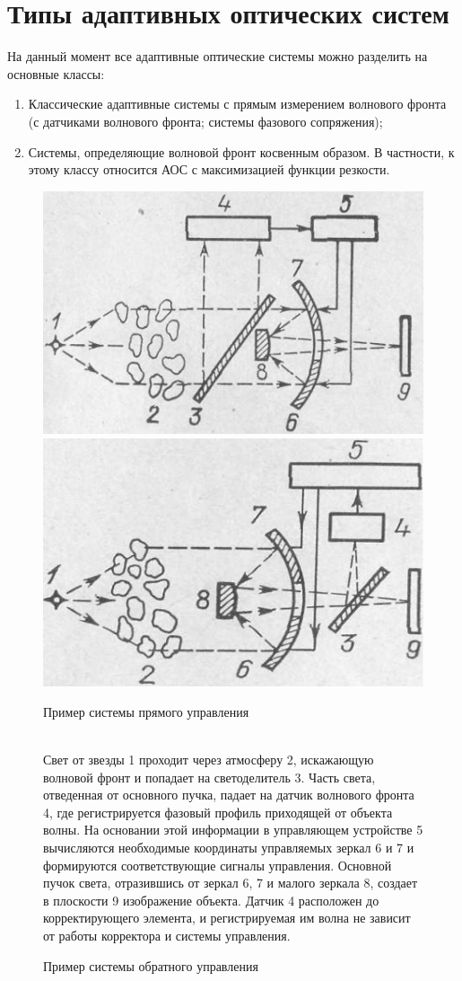 \documentclass[pscyr,titlepage]{hedreport}
\begin{document}
\section{Типы адаптивных оптических систем}

На данный момент все адаптивные оптические системы можно разделить на 
основные классы:
\begin{enumerate}
  \item Классические адаптивные системы с прямым измерением волнового
    фронта (с датчиками волнового фронта; системы фазового сопряжения);
  \item Системы, определяющие волновой фронт косвенным образом. В частности, к
    этому классу относится АОС с максимизацией функции резкости. 
\end{enumerate}

\begin{figure}[ht]
  \center
  \includegraphics[width=.47\textwidth]{ds_1_1} \hfill
  \includegraphics[width=.47\textwidth]{ds_1_2} \\
  \parbox{.47\textwidth}{ \caption{Пример системы прямого управления}
    \label{pic1} } \hfill
  \parbox{.47\textwidth}{ \caption{Пример системы обратного управления}
    \label{pic2} } \\
  {
  \footnotesize
    Свет от звезды 1 проходит через атмосферу 2, искажающую волновой фронт и
    попадает на светоделитель 3. Часть света, отведенная от основного пучка,
    падает на датчик волнового фронта 4, где регистрируется фазовый профиль
    приходящей от объекта волны. На основании этой информации в управляющем
    устройстве 5 вычисляются необходимые координаты управляемых зеркал 6 и 7 и
    формируются соответствующие сигналы управления. Основной пучок света,
    отразившись от зеркал 6, 7 и малого зеркала 8, создает в плоскости 9
    изображение объекта. Датчик 4 расположен до корректирующего элемента,
    и регистрируемая им волна не зависит от работы корректора и системы
    управления. 
  }
\end{figure}
\end{document}
